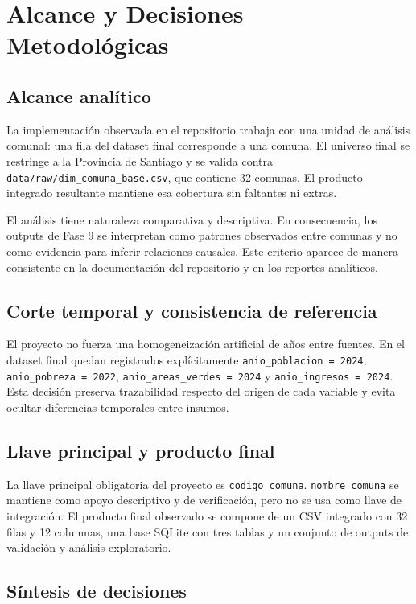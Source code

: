 \chapter{Alcance y Decisiones Metodológicas}

\section{Alcance analítico}

La implementación observada en el repositorio trabaja con una unidad de análisis comunal: una fila del dataset final corresponde a una comuna. El universo final se restringe a la Provincia de Santiago y se valida contra \texttt{data/raw/dim\_comuna\_base.csv}, que contiene 32 comunas. El producto integrado resultante mantiene esa cobertura sin faltantes ni extras.

El análisis tiene naturaleza comparativa y descriptiva. En consecuencia, los outputs de Fase 9 se interpretan como patrones observados entre comunas y no como evidencia para inferir relaciones causales. Este criterio aparece de manera consistente en la documentación del repositorio y en los reportes analíticos.

\section{Corte temporal y consistencia de referencia}

El proyecto no fuerza una homogeneización artificial de años entre fuentes. En el dataset final quedan registrados explícitamente \texttt{anio\_poblacion = 2024}, \texttt{anio\_pobreza = 2022}, \texttt{anio\_areas\_verdes = 2024} y \texttt{anio\_ingresos = 2024}. Esta decisión preserva trazabilidad respecto del origen de cada variable y evita ocultar diferencias temporales entre insumos.

\section{Llave principal y producto final}

La llave principal obligatoria del proyecto es \texttt{codigo\_comuna}. \texttt{nombre\_comuna} se mantiene como apoyo descriptivo y de verificación, pero no se usa como llave de integración. El producto final observado se compone de un CSV integrado con 32 filas y 12 columnas, una base SQLite con tres tablas y un conjunto de outputs de validación y análisis exploratorio.

\section{Síntesis de decisiones}



